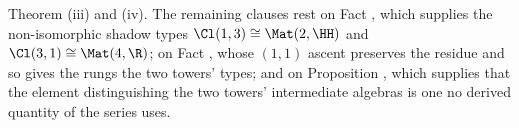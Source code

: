 Theorem (iii) and (iv). The remaining clauses rest on Fact , which supplies the non-isomorphic shadow types $\Cl(1,3) \cong \Mat(2,\HH)$ and $\Cl(3,1) \cong \Mat(4,\R)$; on Fact , whose $(1,1)$ ascent preserves the residue and so gives the rungs the two towers' types; and on Proposition , which supplies that the element distinguishing the two towers' intermediate algebras is one no derived quantity of the series uses.
